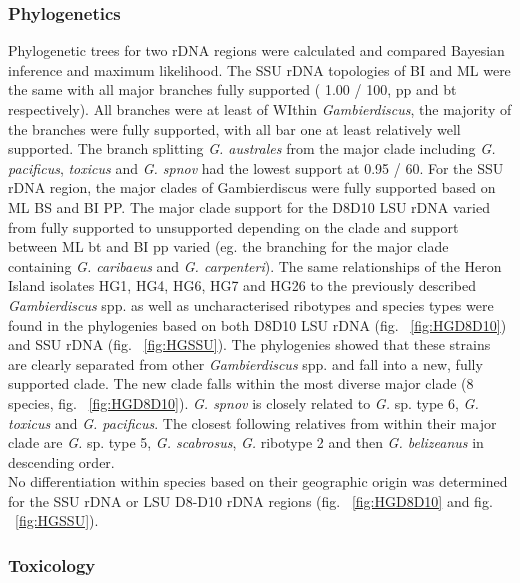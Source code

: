 \documentclass[12pt]{article}
\begin{document}

\subsubsection{Phylogenetics}

Phylogenetic trees for two rDNA regions were calculated and compared Bayesian inference and maximum likelihood. The SSU rDNA  topologies of BI and ML were the same with all major branches fully supported ( 1.00 / 100, pp and bt respectively). All branches were at least of  WIthin \emph{Gambierdiscus}, the majority of the branches were fully supported, with all bar one at least relatively well supported. The branch splitting \emph{G. australes} from the major clade including \emph{G. pacificus}, \emph{toxicus} and \emph{G. spnov} had the lowest support at 0.95 / 60.
For the SSU rDNA region, the major clades of Gambierdiscus were fully supported based on ML BS and BI PP. The major clade support for the D8D10 LSU rDNA varied from fully supported to unsupported depending on the clade and support between ML bt and BI pp varied (eg. the branching for the major clade containing \emph{G. caribaeus} and \emph{G. carpenteri}). The same relationships of the Heron Island isolates HG1, HG4, HG6, HG7 and HG26 to the previously described \emph{Gambierdiscus} spp. as well as uncharacterised ribotypes and species types were found in the phylogenies based on both D8D10 LSU rDNA (fig. ~\ref{fig:HGD8D10}) and SSU rDNA (fig. ~\ref{fig:HGSSU}). The phylogenies showed that these strains are clearly separated from other \emph{Gambierdiscus} spp. and fall into a new, fully supported clade. The new clade falls within the most diverse major clade (8 species, fig. ~\ref{fig:HGD8D10}). \emph{G. spnov} is closely related to \emph{G.} sp. type 6, \emph{G. toxicus} and \emph{G. pacificus}. The closest following relatives from within their major clade are \emph{G.} sp. type 5, \emph{G. scabrosus}, \emph{G.} ribotype 2 and then \emph{G. belizeanus} in descending order. \\
No differentiation within species based on their geographic origin was determined for the SSU rDNA or LSU D8-D10 rDNA regions (fig. ~\ref{fig:HGD8D10} and fig. ~\ref{fig:HGSSU}).


\subsubsection{Toxicology}
\end{document}
